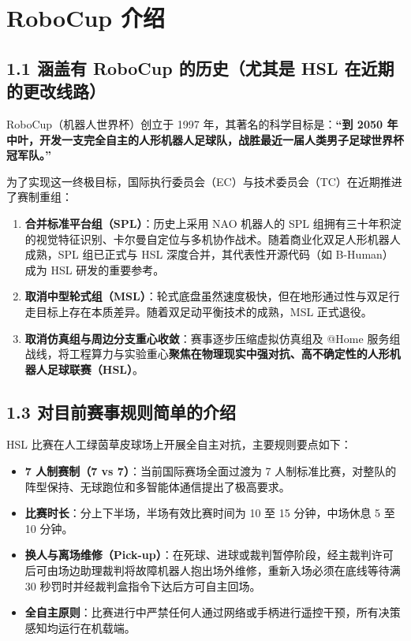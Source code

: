 \documentclass[11pt,a4paper]{ctexart}
\begin{document}
\thispagestyle{empty}
\tableofcontents
\newpage
\setcounter{page}{1}

\section{RoboCup 介绍}

\subsection{1.1 涵盖有 RoboCup 的历史（尤其是 HSL 在近期的更改线路）}
RoboCup（机器人世界杯）创立于 1997 年，其著名的科学目标是：\textbf{“到 2050 年中叶，开发一支完全自主的人形机器人足球队，战胜最近一届人类男子足球世界杯冠军队。”}

为了实现这一终极目标，国际执行委员会（EC）与技术委员会（TC）在近期推进了赛制重组：
\begin{enumerate}[leftmargin=*]
    \item \textbf{合并标准平台组（SPL）}：历史上采用 NAO 机器人的 SPL 组拥有三十年积淀的视觉特征识别、卡尔曼自定位与多机协作战术。随着商业化双足人形机器人成熟，SPL 组已正式与 HSL 深度合并，其代表性开源代码（如 B-Human）成为 HSL 研发的重要参考。
    \item \textbf{取消中型轮式组（MSL）}：轮式底盘虽然速度极快，但在地形通过性与双足行走目标上存在本质差异。随着双足动平衡技术的成熟，MSL 正式退役。
    \item \textbf{取消仿真组与周边分支重心收敛}：赛事逐步压缩虚拟仿真组及 @Home 服务组战线，将工程算力与实验重心\textbf{聚焦在物理现实中强对抗、高不确定性的人形机器人足球联赛（HSL）}。
\end{enumerate}

\subsection{1.3 对目前赛事规则简单的介绍}
HSL 比赛在人工绿茵草皮球场上开展全自主对抗，主要规则要点如下：
\begin{itemize}[leftmargin=*]
    \item \textbf{7 人制赛制（7 vs 7）}：当前国际赛场全面过渡为 7 人制标准比赛，对整队的阵型保持、无球跑位和多智能体通信提出了极高要求。
    \item \textbf{比赛时长}：分上下半场，半场有效比赛时间为 10 至 15 分钟，中场休息 5 至 10 分钟。
    \item \textbf{换人与离场维修（Pick-up）}：在死球、进球或裁判暂停阶段，经主裁判许可后可由场边助理裁判将故障机器人抱出场外维修，重新入场必须在底线等待满 30 秒罚时并经裁判盒指令下达后方可自主回场。
    \item \textbf{全自主原则}：比赛进行中严禁任何人通过网络或手柄进行遥控干预，所有决策感知均运行在机载端。
\end{itemize}
\end{document}
